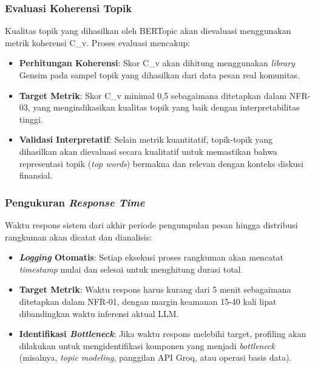 \subsubsection{Evaluasi Koherensi Topik}

Kualitas topik yang dihasilkan oleh BERTopic akan dievaluasi menggunakan metrik koherensi C\_v. Proses evaluasi mencakup:

\begin{itemize}
\item \textbf{Perhitungan Koherensi}: Skor C\_v akan dihitung menggunakan \textit{library} Gensim pada sampel topik yang dihasilkan dari data pesan real komunitas.

\item \textbf{Target Metrik}: Skor C\_v minimal 0,5 sebagaimana ditetapkan dalam NFR-03, yang mengindikasikan kualitas topik yang baik dengan interpretabilitas tinggi.

\item \textbf{Validasi Interpretatif}: Selain metrik kuantitatif, topik-topik yang dihasilkan akan dievaluasi secara kualitatif untuk memastikan bahwa representasi topik (\textit{top words}) bermakna dan relevan dengan konteks diskusi finansial.
\end{itemize}

\subsubsection{Pengukuran \textit{Response Time}}

Waktu respons sistem dari akhir periode pengumpulan pesan hingga distribusi rangkuman akan dicatat dan dianalisis:

\begin{itemize}
\item \textbf{\textit{Logging} Otomatis}: Setiap eksekusi proses rangkuman akan mencatat \textit{timestamp} mulai dan selesai untuk menghitung durasi total.

\item \textbf{Target Metrik}: Waktu respons harus kurang dari 5 menit sebagaimana ditetapkan dalam NFR-01, dengan margin keamanan 15-40 kali lipat dibandingkan waktu inferensi aktual LLM.

\item \textbf{Identifikasi \textit{Bottleneck}}: Jika waktu respons melebihi target, profiling akan dilakukan untuk mengidentifikasi komponen yang menjadi \textit{bottleneck} (misalnya, \textit{topic modeling}, panggilan API Groq, atau operasi basis data).
\end{itemize}

